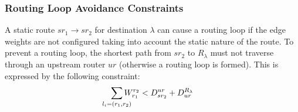 \subsubsection{Routing Loop Avoidance Constraints}
A static route $sr_1 \rightarrow sr_2$ for destination $\lambda$ 
can cause a routing loop if the edge weights are not configured taking into
account the static nature of the route. To prevent a routing loop, the shortest
path from $sr_2$ to $R_\lambda$ must not traverse through an upstream router 
$ur$ (otherwise a routing loop is formed). 
This is expressed by the following constraint: 
\[
 \sum_{\mathclap{\substack{l_i=(r_1,r_2)}}} 
 W_{r_1}^{r_2} < D^{ur}_{sr_2} + D_{ur}^{R_\lambda} 
\]		

